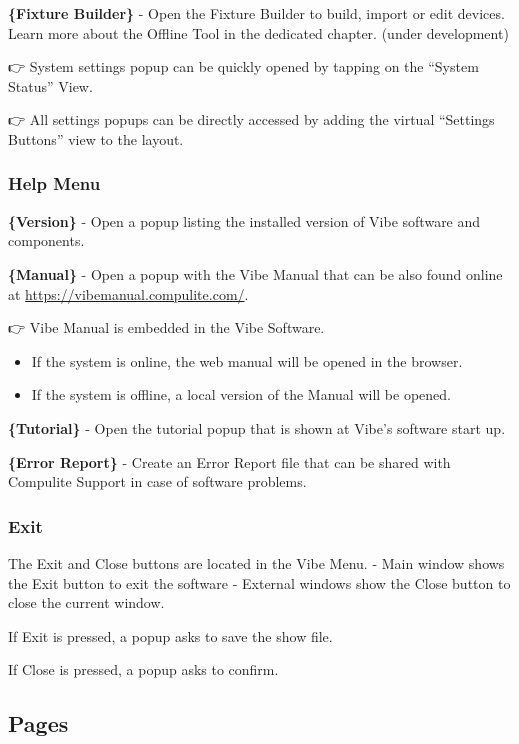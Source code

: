 \documentclass[
]{article}
\begin{document}
\textbf{\{Fixture Builder\}} - Open the Fixture Builder to build, import or edit devices.
Learn more about the Offline Tool in the dedicated chapter. { (under development) }

👉 System settings popup can be quickly opened by tapping on the ``System Status'' View.

👉 All settings popups can be directly accessed by adding the virtual ``Settings Buttons'' view to the layout.

\hypertarget{help-menu}{%
\subsubsection{Help Menu}\label{help-menu}}

\textbf{\{Version\}} - Open a popup listing the installed version of Vibe software and components.

\textbf{\{Manual\}} - Open a popup with the Vibe Manual that can be also found online at \url{https://vibemanual.compulite.com/}.

👉 Vibe Manual is embedded in the Vibe Software.

\begin{itemize}
\item
  If the system is online, the web manual will be opened in the browser.
\item
  If the system is offline, a local version of the Manual will be opened.
\end{itemize}

\textbf{\{Tutorial\}} - Open the tutorial popup that is shown at Vibe's software start up.

\textbf{\{Error Report\}} - Create an Error Report file that can be shared with Compulite Support in case of software problems.

\hypertarget{exit}{%
\subsubsection{Exit}\label{exit}}

The Exit and Close buttons are located in the Vibe Menu.
- Main window shows the Exit button to exit the software
- External windows show the Close button to close the current window.

If Exit is pressed, a popup asks to save the show file.

If Close is pressed, a popup asks to confirm.

\hypertarget{Pages-3.3}{%
\subsection{Pages}\label{Pages-3.3}}
\end{document}

